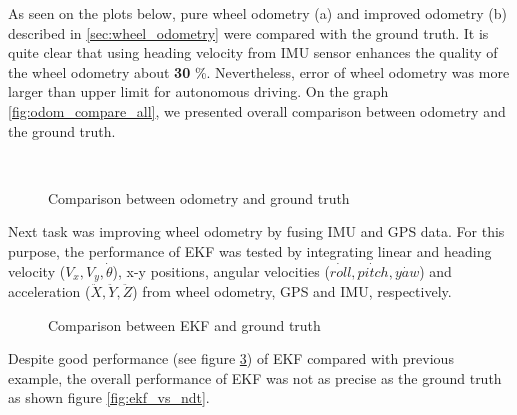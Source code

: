 As seen on the plots below, pure wheel odometry (a) and improved odometry (b) described in \ref{sec:wheel_odometry} were compared with the ground truth. It is quite clear that using heading velocity from IMU sensor enhances the quality of the wheel odometry about \textbf{30} \%. Nevertheless, error of wheel odometry was more larger than  upper limit for autonomous driving. On the graph \ref{fig:odom_compare_all}, we presented overall comparison between odometry and the ground truth.
\begin{figure}[H]
\centering
{}\\
\label{fig:wheel_compare}
\end{figure}
\vspace{-0.5cm}
\begin{figure}[H]
    \centering
    \caption{Comparison between odometry and ground truth}
    \label{fig:my_label}
\end{figure}

\par Next task was improving wheel odometry by fusing IMU and GPS data. For this purpose, the performance of EKF was tested by integrating linear and heading velocity ($V_x, V_y, \dot{\theta}$), x-y positions, angular velocities ($\dot {roll}, \dot {pitch}, \dot {yaw}$) and acceleration ($\ddot X, \ddot Y, \ddot Z$) from wheel odometry, GPS and IMU, respectively. 
\begin{figure}[H]
    \centering
\end{figure}
\vspace{-0.5cm}
\begin{figure}[H]
    \centering
    \caption{Comparison between EKF and ground truth}
    \label{fig:ekf_graph}
\end{figure}
\noindent Despite good performance (see figure \ref{fig:ekf_graph}) of EKF compared with previous example, the overall performance of EKF was not as precise as the ground truth as shown figure \ref{fig:ekf_vs_ndt}.

